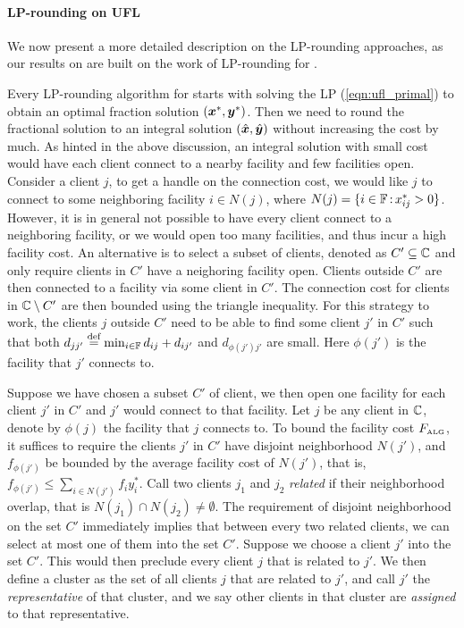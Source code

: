 \documentclass[oneside,final]{ucr}
\begin{document}
\paragraph{LP-rounding on UFL}
We now present a more detailed description on the
LP-rounding approaches, as our results on {\FTFP} are built
on the work of LP-rounding for {\UFL}.

Every LP-rounding algorithm for {\UFL} starts with solving
the LP (\ref{eqn:ufl_primal}) to obtain an optimal fraction
solution $(\boldsymbol{x}^\ast,\boldsymbol{y}^\ast)$. Then we need to round the
fractional solution to an integral solution
$(\hat{\boldsymbol{x}},\hat{\boldsymbol{y}})$ without increasing the cost by
much. As hinted in the above discussion, an integral
solution with small cost would have each client connect to a
nearby facility and few facilities open. Consider a client
$j$, to get a handle on the connection cost, we would like
$j$ to connect to some neighboring facility $i\in N(j)$,
where $N(j) = \{i\in\mathbb{F} {\,:\,} x_{ij}^\ast >
0\}$. However, it is in general not possible to have every
client connect to a neighboring facility, or we would open
too many facilities, and thus incur a high facility cost. An
alternative is to select a subset of clients, denoted as $C'
\subseteq \mathbb{C}$ and only require clients in $C'$ have
a neighoring facility open. Clients outside $C'$ are then
connected to a facility via some client in $C'$. The
connection cost for clients in $\mathbb{C} \setminus C'$ are
then bounded using the triangle inequality. For this
strategy to work, the clients $j$ outside $C'$ need to be
able to find some client $j'$ in $C'$ such that both
$d_{jj'} \stackrel{\text{def}}{=} \min_{i\in \mathbb{F}} d_{ij} + d_{ij'}$ and
$d_{\phi(j') j'}$ are small. Here $\phi(j')$ is the facility
that $j'$ connects to.

Suppose we have chosen a subset $C'$ of client, we then open
one facility for each client $j'$ in $C'$ and $j'$ would
connect to that facility. Let $j$ be any client in
$\mathbb{C}$, denote by $\phi(j)$ the facility that $j$
connects to. To bound the facility cost $F_{\mbox{\tiny\rm ALG}}$, it
suffices to require the clients $j'$ in $C'$ have disjoint
neighborhood $N(j')$, and $f_{\phi(j')}$ be bounded by the
average facility cost of $N(j')$, that is, $f_{\phi(j')}
\leq \sum_{i\in N(j')} f_i y_i^\ast$. Call two clients $j_1$
and $j_2$ \emph{related} if their neighborhood overlap, that
is $N(j_1) \cap N(j_2) \neq \emptyset$. The requirement of
disjoint neighborhood on the set $C'$ immediately implies
that between every two related clients, we can select at
most one of them into the set $C'$. Suppose we choose a
client $j'$ into the set $C'$. This would then preclude
every client $j$ that is related to $j'$. We then define a
cluster as the set of all clients $j$ that are related to
$j'$, and call $j'$ the \emph{representative} of that
cluster, and we say other clients in that cluster are
\emph{assigned} to that representative.
\end{document}
